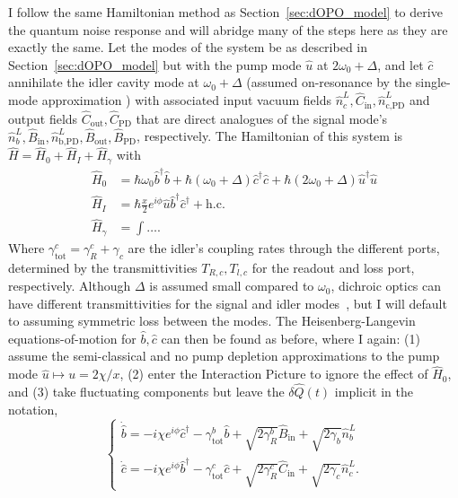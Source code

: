 I follow the same Hamiltonian method as Section~\ref{sec:dOPO_model} to derive the quantum noise response and will abridge many of the steps here as they are exactly the same. Let the modes of the system be as described in Section~\ref{sec:dOPO_model} but with the pump mode $\hat u$ at $2\omega_0+\Delta$, and let $\hat c$ annihilate the idler cavity mode at $\omega_0+\Delta$ (assumed on-resonance by the single-mode approximation ) with associated input vacuum fields $\hat n^L_c, \hat C_\text{in}, \hat n^L_\text{c,PD}$ and output fields $\hat C_\text{out}, \hat C_\text{PD}$ that are direct analogues of the signal mode's $\hat n^L_b, \hat B_\text{in}, \hat n^L_\text{b,PD}, \hat B_\text{out}, \hat B_\text{PD}$, respectively. The Hamiltonian of this system is $\hat H = \hat H_0+\hat H_I+\hat H_\gamma$ with 
\begin{align}
\hat H_0 &= \hbar \omega_0 \hat b^\dag \hat b + \hbar (\omega_0+\Delta) \hat c^\dag \hat c + \hbar (2\omega_0+\Delta) \hat u^\dag \hat u\\
\hat H_I &= \hbar \frac{x}{2} e^{i\phi} \hat u \hat b^\dag \hat c^\dag + \text{h.c.}\\
\hat H_\gamma &= \int \ldots .
\end{align}
Where $\gamma^c_\text{tot}=\gamma^c_R+\gamma_c$ are the idler's coupling rates through the different ports, determined by the transmittivities $T_{R,c}, T_{l,c}$ for the readout and loss port, respectively. Although $\Delta$ is assumed small compared to $\omega_0$, dichroic optics can have different transmittivities for the signal and idler modes~\cite{}, but I will default to assuming symmetric loss between the modes. The Heisenberg-Langevin equations-of-motion for $\hat b, \hat c$ can then be found as before, where I again: (1) assume the semi-classical and no pump depletion approximations to the pump mode $\hat u\mapsto u=2\chi/x$, (2) enter the Interaction Picture to ignore the effect of $\hat H_0$, and (3) take fluctuating components but leave the $\delta \hat Q(t)$ implicit in the notation,
\begin{equation}\begin{cases}
\dot{\hat{b}}=-i\chi e^{i\phi}\hat{c}^\dagger - \gamma^b_\mathrm{tot} \hat{b} + \sqrt{2\gamma^b_R}\hat{B}_\mathrm{in} + \sqrt{2\gamma_b}\hat{n}^L_b\\
\dot{\hat{c}}=-i\chi e^{i\phi}\hat{b}^\dagger - \gamma^c_\mathrm{tot} \hat{c} + \sqrt{2\gamma^c_R}\hat{C}_\mathrm{in} + \sqrt{2\gamma_c}\hat{n}^L_c.
\end{cases}\end{equation}
